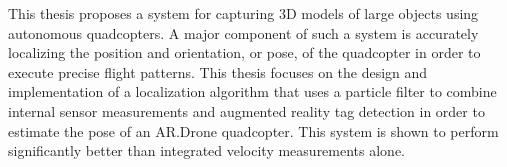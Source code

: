 This thesis proposes a system for capturing 3D models of large objects using autonomous quadcopters. A major component of such a system is accurately localizing the position and orientation, or pose, of the quadcopter in order to execute precise flight patterns. This thesis focuses on the design and implementation of a localization algorithm that uses a particle filter to combine internal sensor measurements and augmented reality tag detection in order to estimate the pose of an AR.Drone quadcopter. This system is shown to perform significantly better than integrated velocity measurements alone.